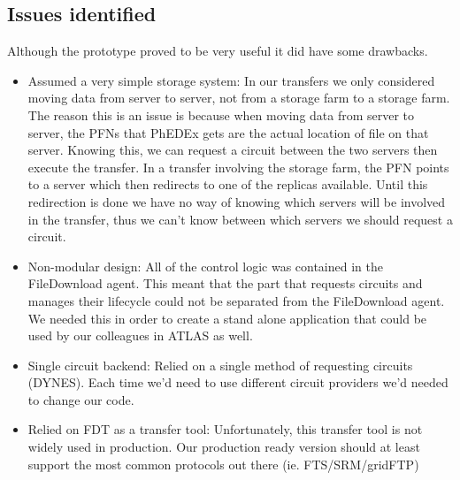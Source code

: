 \subsection{Issues identified}

Although the prototype proved to be very useful it did have some drawbacks.

\begin{itemize}
  \item Assumed a very simple storage system: In our transfers we only considered moving data from
  server to server, not from a storage farm to a storage farm. The reason this is an issue is
  because when moving data from server to server, the PFNs that PhEDEx gets are the actual 
  location of file on that server. Knowing this, we can request a circuit between the two servers
  then execute the transfer. In a transfer involving the storage farm, the PFN points to a 
  server which then redirects to one of the replicas available. Until this redirection is done 
  we have no way of knowing which servers will be involved in the transfer, thus we can't know 
  between which servers we should request a circuit.
  \item Non-modular design: All of the control logic was contained in the FileDownload agent.
  This meant that the part that requests circuits and manages their lifecycle could not be 
  separated from the FileDownload agent. We needed this in order to create a stand alone 
  application that could be used by our colleagues in ATLAS as well.
  \item Single circuit backend: Relied on a single method of requesting circuits (DYNES). Each time 
  we'd need to use different circuit providers we'd needed to change our code.
  \item Relied on FDT as a transfer tool: Unfortunately, this transfer tool is not widely used
  in production. Our production ready version should at least support the most common protocols
  out there (ie. FTS/SRM/gridFTP)
\end{itemize}


